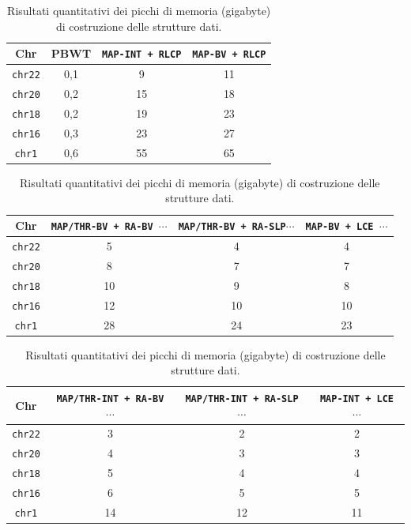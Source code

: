 \begin{table}
  \centering
  \caption{Risultati quantitativi dei picchi di memoria (gigabyte) di
    costruzione delle 
    strutture dati.} 
  \label{tab:makemem}
  \footnotesize
  \begin{tabular}{c||c|c|c} 
    \textbf{Chr}
    & \textbf{PBWT}
    & \textbf{\texttt{MAP-INT + RLCP}}
    & \textbf{\texttt{MAP-BV + RLCP}}\\
    \hline
    \hline
    \texttt{chr22} & 0,1 & 9 & 11  \\
    \texttt{chr20} & 0,2 & 15 & 18 \\
    \texttt{chr18} & 0,2 & 19 & 23 \\
    \texttt{chr16} & 0,3 & 23 & 27 \\
    \texttt{chr1} & 0,6 & 55 & 65  \\
  \end{tabular}
  \vspace{+3mm}
  \vspace{+1mm}
  \begin{tabular}{c||c|c|c} 
    \textbf{Chr}
    & \textbf{\texttt{MAP/THR-BV + RA-BV $\cdots$}}
    & \textbf{\texttt{MAP/THR-BV + RA-SLP$\cdots$}}
    & \textbf{\texttt{MAP-BV + LCE $\cdots$}}\\
    \hline
    \hline
    \texttt{chr22} & 5 & 4 & 4 \\
    \texttt{chr20} & 8 & 7 & 7 \\
    \texttt{chr18} & 10 & 9 & 8  \\
    \texttt{chr16} & 12 & 10 & 10 \\
    \texttt{chr1} & 28 & 24 & 23 \\
  \end{tabular}
  \vspace{+3mm}
  \vspace{+1mm}
  \begin{tabular}{c||c|c|c} 
    \textbf{Chr}
    & \textbf{\texttt{MAP/THR-INT + RA-BV $\cdots$}}
    & \textbf{\texttt{MAP/THR-INT + RA-SLP $\cdots$}}
    & \textbf{\texttt{MAP-INT + LCE $\cdots$}}\\
    \hline
    \hline
    \texttt{chr22} & 3 & 2 & 2 \\
    \texttt{chr20} & 4 & 3 & 3 \\
    \texttt{chr18} & 5 & 4 & 4 \\
    \texttt{chr16} & 6 & 5 & 5 \\
    \texttt{chr1} & 14 & 12 & 11 
  \end{tabular}
\end{table}
